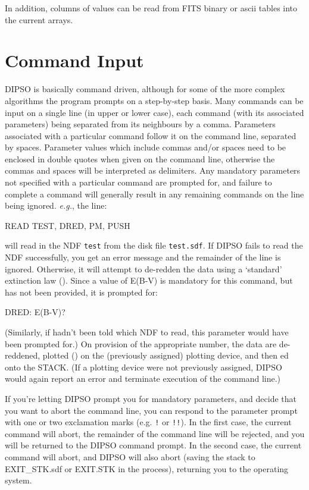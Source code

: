 \documentclass[twoside,11pt,noabs,nolof]{starlink}
\begin{document}
In addition, columns of values can be read from FITS binary or ascii
tables into the current arrays.

\section {Command Input}

DIPSO is basically command driven, although for some of the more
complex algorithms the program prompts on a step-by-step basis. Many
commands can be input on a single line (in upper or lower case), each
command (with its associated parameters) being separated from its
neighbours by a comma. Parameters associated with a particular command
follow it on the command line, separated by spaces. Parameter values
which include commas and/or spaces need to be enclosed in double quotes
when given on the command line, otherwise the commas and spaces will be
interpreted as delimiters. Any mandatory
parameters not specified with a particular command are prompted for,
and failure to complete a command will generally result in any
remaining commands on the line being ignored. \emph{e.g.}, the line:

\begin{terminalv}
READ TEST, DRED, PM, PUSH
\end{terminalv}

will read in the NDF {\texttt{test}}  from the disk file {\texttt{test.sdf}}.  If DIPSO
fails to read the NDF successfully, you get an error message and the remainder
of the line is ignored. Otherwise, it will attempt to de-redden the data using a
`standard' extinction law ().  Since a value of E(B-V) is mandatory for
this command, but has not been provided, it is prompted for:

\begin{terminalv}
DRED: E(B-V)?
\end{terminalv}

(Similarly, if   hadn't been told which NDF to read, this
parameter would have been prompted for.) On provision of the
appropriate number, the data are de-reddened, plotted ()  on the
(previously assigned) plotting device, and then ed onto the STACK.
(If a plotting device were not previously assigned, DIPSO would again
report an error and terminate execution of the command line.)

If you're letting DIPSO prompt you for mandatory parameters, and decide
that you want to abort the command line, you can respond to the parameter
prompt with one or two exclamation marks (e.g. {\texttt{!}}  or {\texttt{!!}}).  In the
first case, the current command will abort, the remainder of the command
line will be rejected, and you will be returned to the DIPSO command
prompt. In the second case, the current command will abort, and DIPSO
will also abort (saving the stack to EXIT\_STK.sdf or EXIT.STK in the
process), returning you to the operating system.
\end{document}
